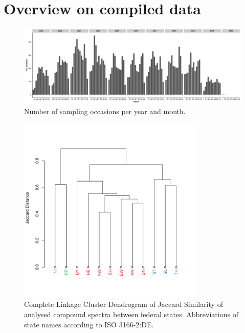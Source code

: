 \documentclass[pdftex,a4paper]{scrreprt}
\begin{document}
\chapter{Overview on compiled data}


\begin{figure}[h]
	\centering
	\includegraphics[width = \textwidth]{temporal}
	\caption{Number of sampling occasions per year and month.}
	\label{fig:temporal}
\end{figure}

\begin{figure}[h]
	\centering
	\includegraphics[width = 0.8\textwidth]{varclus}
	\caption[Complete Linkage Cluster Dendrogram of Jaccard Similarity of analysed compound spectra between federal states.]{Complete Linkage Cluster Dendrogram of Jaccard Similarity of analysed compound spectra between federal states. Abbreviations of state names according to ISO 3166-2:DE.}
	\label{fig:varclus}
\end{figure}


\end{document}
